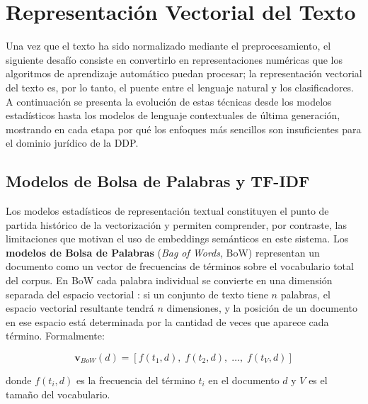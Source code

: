 \section{Representación Vectorial del Texto}

Una vez que el texto ha sido normalizado mediante el preprocesamiento, el siguiente
desafío consiste en convertirlo en representaciones numéricas que los algoritmos
de aprendizaje automático puedan procesar; la representación vectorial del texto
es, por lo tanto, el puente entre el lenguaje natural y los clasificadores. A
continuación se presenta la evolución de estas técnicas desde los modelos
estadísticos hasta los modelos de lenguaje contextuales de última generación,
mostrando en cada etapa por qué los enfoques más sencillos son insuficientes para
el dominio jurídico de la DDP.

\subsection{Modelos de Bolsa de Palabras y TF-IDF}

Los modelos estadísticos de representación textual constituyen el punto de
partida histórico de la vectorización y permiten comprender, por contraste, las
limitaciones que motivan el uso de embeddings semánticos en este sistema. Los
\textbf{modelos de Bolsa de Palabras} (\textit{Bag of Words}, BoW) representan
un documento como un vector de frecuencias de términos sobre el vocabulario total
del corpus. En BoW cada palabra individual se convierte en una dimensión separada
del espacio vectorial \cite{manning2008}: si un conjunto de texto tiene $n$ palabras, el espacio
vectorial resultante tendrá $n$ dimensiones, y la posición de un documento en ese
espacio está determinada por la cantidad de veces que aparece cada término.
Formalmente:

\begin{equation}
  \mathbf{v}_{BoW}(d) = [f(t_1, d),\; f(t_2, d),\; \ldots,\; f(t_V, d)]
  \label{eq:bow}
\end{equation}

donde $f(t_i, d)$ es la frecuencia del término $t_i$ en el documento $d$ y $V$
es el tamaño del vocabulario.

